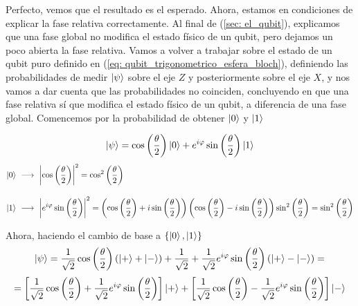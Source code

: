 \documentclass[12pt]{article}
\numberwithin{equation}{section} %
\begin{document}
    Perfecto, vemos que el resultado es el esperado. Ahora, estamos en condiciones de explicar la fase relativa correctamente. Al final de (\ref{sec: el_qubit}), explicamos que una fase global no modifica el estado físico de un qubit, pero dejamos un poco abierta la fase relativa. Vamos a volver a trabajar sobre el estado de un qubit puro definido en (\ref{eq: qubit_trigonometrico_esfera_bloch}), definiendo las probabilidades de medir \( \ket{\psi} \) sobre el eje \( Z \) y posteriormente sobre el eje \( X \), y nos vamos a dar cuenta que las probabilidades no coinciden, concluyendo en que una fase relativa sí que modifica el estado físico de un qubit, a diferencia de una fase global. Comencemos por la probabilidad de obtener \( \ket{0} \) y \( \ket{1} \)

    \begin{equation*}
        \ket{\psi} = \cos \left( \frac{\theta}{2} \right) \ket{0} + e^{i \varphi} \sin \left( \frac{\theta}{2} \right) \ket{1}
    \end{equation*}
    \begin{align*}
        \ket{0} \ &\longrightarrow \ \left| \cos \left( \frac{\theta}{2} \right) \right| ^ {2} = \cos^{2} \left( \frac{\theta}{2} \right) \\[10pt]
        \ket{1} \ &\longrightarrow \ \left| e^{i \varphi} \sin \left( \frac{\theta}{2} \right) \right| ^ {2} = \left( \cos \left( \frac{\theta}{2} \right) + i \sin \left( \frac{\theta}{2} \right) \right) \left( \cos \left( \frac{\theta}{2} \right) - i \sin \left( \frac{\theta}{2} \right) \right) \sin^{2} \left( \frac{\theta}{2} \right) = \sin^{2} \left( \frac{\theta}{2} \right)
    \end{align*}

    \vspace{2.5mm}

    Ahora, haciendo el cambio de base a \( \left\{ \ket{0}, \ket{1} \right\} \)
    \begin{equation*}
        \ket{\psi} = \frac{1}{\sqrt{2}} \cos \left( \frac{\theta}{2} \right) \left( \ket{+} + \ket{-} \right) + \frac{1}{\sqrt{2}} + \frac{1}{\sqrt{2}} e^{i \varphi} \sin \left( \frac{\theta}{2} \right) \left( \ket{+} - \ket{-} \right) = 
    \end{equation*}
    \begin{equation*}
        = \left[ \frac{1}{\sqrt{2}} \cos \left( \frac{\theta}{2} \right) + \frac{1}{\sqrt{2}} e^{i \varphi} \sin \left( \frac{\theta}{2} \right) \right] \ket{+} + \left[ \frac{1}{\sqrt{2}} \cos \left( \frac{\theta}{2} \right) - \frac{1}{\sqrt{2}} e^{i \varphi} \sin \left( \frac{\theta}{2} \right) \right] \ket{-} 
    \end{equation*}
\end{document}

